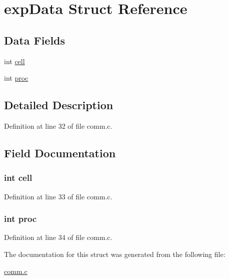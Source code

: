 \hypertarget{structexpData}{\section{exp\-Data Struct Reference}
\label{structexpData}
}
\subsection*{Data Fields}
\begin{DoxyCompactItemize}
\item 
int \hyperlink{structexpData_af00601a22186810a9e6d16efb75862ce}{cell}
\item 
int \hyperlink{structexpData_a7e9d757c9982bd721d598bad366fbe62}{proc}
\end{DoxyCompactItemize}


\subsection{Detailed Description}


Definition at line 32 of file comm.\-c.



\subsection{Field Documentation}
\hypertarget{structexpData_af00601a22186810a9e6d16efb75862ce}{
\subsubsection[{cell}]{\setlength{\rightskip}{0pt plus 5cm}int cell}}\label{structexpData_af00601a22186810a9e6d16efb75862ce}


Definition at line 33 of file comm.\-c.

\hypertarget{structexpData_a7e9d757c9982bd721d598bad366fbe62}{
\subsubsection[{proc}]{\setlength{\rightskip}{0pt plus 5cm}int proc}}\label{structexpData_a7e9d757c9982bd721d598bad366fbe62}


Definition at line 34 of file comm.\-c.



The documentation for this struct was generated from the following file\-:\begin{DoxyCompactItemize}
\item 
\hyperlink{comm_8c}{comm.\-c}\end{DoxyCompactItemize}
